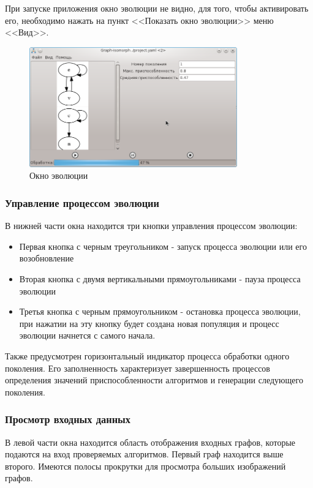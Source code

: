 \documentclass[russian,utf8,emptystyle]{eskdtext}
\begin{document}
При запуске приложения окно эволюции не видно, для того, чтобы активировать его, необходимо нажать на пункт <<Показать окно эволюции>> меню <<Вид>>.

\begin{figure}[h!]
\centering
\includegraphics[width=0.8\textwidth]{screen09}
\caption{Окно эволюции}
\end{figure}

\subsubsection{Управление процессом эволюции}
В нижней части окна находится три кнопки управления процессом эволюции:
\begin{itemize}
\item Первая кнопка с черным треугольником - запуск процесса эволюции или его возобновление
\item Вторая кнопка с двумя вертикальными прямоугольниками - пауза процесса эволюции
\item Третья кнопка с черным прямоугольником - остановка процесса эволюции, при нажатии на эту кнопку будет создана новая популяция и процесс эволюции начнется с самого начала.
\end{itemize}

Также предусмотрен горизонтальный индикатор процесса обработки одного поколения. Его заполненность характеризует завершенность процессов определения значений приспособленности алгоритмов и генерации следующего поколения.

\subsubsection{Просмотр входных данных}
В левой части окна находится область отображения входных графов, которые подаются на вход проверяемых алгоритмов. Первый граф находится выше второго. Имеются полосы прокрутки для просмотра больших изображений графов.
\end{document}
